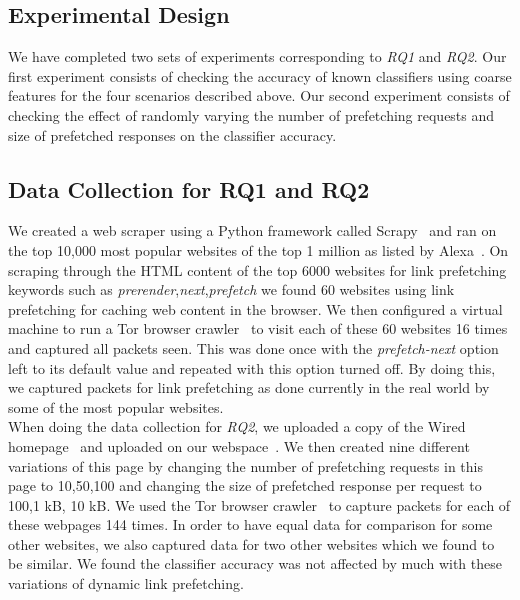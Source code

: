 \subsection{Experimental Design}
We have completed two sets of experiments corresponding to \emph{RQ1} and
\emph{RQ2}. Our first experiment consists of checking the accuracy of
known classifiers using coarse features for the four scenarios described
above. Our second experiment consists of checking the effect of randomly
varying the number of prefetching requests and size of prefetched
responses on the classifier accuracy.

\subsection{Data Collection for RQ1 and RQ2}
We created a web scraper using a Python framework called
Scrapy~\cite{scrapy} and ran on the top 10,000 most popular websites of
the top 1 million as
listed by Alexa~\cite{alexa-top}. On scraping through the HTML content of
the top 6000 websites for link prefetching keywords such as
\textit{prerender},\textit{next},\textit{prefetch} we found 60 websites
using link prefetching for caching web content in the browser. We then
configured a virtual machine to run a Tor browser crawler~\cite{tor-browser-crawler} to visit each
of these 60 websites 16 times and captured all packets seen. This was
done once with the \textit{prefetch-next} option left to its default
value and repeated with this option turned off. By doing this, we
captured packets for link prefetching as done currently in the real
world by some of the most popular websites. \\
When doing the data collection for \emph{RQ2}, we uploaded a copy of
the Wired homepage~\cite{wired} and uploaded on our
webspace~\cite{tj-wired}. We then created nine different variations of
this page by changing the number of prefetching requests in this page to
10,50,100 and changing the size of prefetched response per request to
100,1 kB, 10 kB. We used the Tor browser
crawler~\cite{tor-browser-crawler} to capture packets for each of these
webpages 144 times. In order to have equal data for comparison for some
other websites, we also captured data for two other websites which we
found to be similar.
We found the classifier accuracy was not affected by much with these variations of dynamic link prefetching. 


